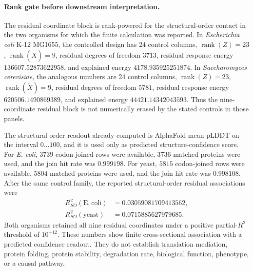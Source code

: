 \paragraph{Rank gate before downstream interpretation.}
The residual coordinate block is rank-powered for the structural-order contact in the two organisms for which the finite calculation was reported. In \emph{Escherichia coli} K-12 MG1655, the controlled design has $24$ control columns, $\operatorname{rank}(Z)=23$, $\operatorname{rank}(\widetilde X)=9$, residual degrees of freedom $3713$, residual response energy $136607.52873622958$, and explained energy $4178.935925251874$. In \emph{Saccharomyces cerevisiae}, the analogous numbers are $24$ control columns, $\operatorname{rank}(Z)=23$, $\operatorname{rank}(\widetilde X)=9$, residual degrees of freedom $5781$, residual response energy $620506.1490869389$, and explained energy $44421.14342043593$. Thus the nine-coordinate residual block is not numerically erased by the stated controls in those panels.

The structural-order readout already computed is AlphaFold mean pLDDT on the interval $0\ldots 100$, and it is used only as predicted structure-confidence score. For \emph{E. coli}, $3739$ codon-joined rows were available, $3736$ matched proteins were used, and the join hit rate was $0.999198$. For yeast, $5815$ codon-joined rows were available, $5804$ matched proteins were used, and the join hit rate was $0.998108$. After the same control family, the reported structural-order residual associations were
$$
\begin{aligned}
R^2_{SO}(\mathrm{E.\ coli}) &= 0.03059081709413562,\\
R^2_{SO}(\mathrm{yeast}) &= 0.0715885627979685.
\end{aligned}
$$
Both organisms retained all nine residual coordinates under a positive partial-$R^2$ threshold of $10^{-12}$. These numbers show finite cross-sectional association with a predicted confidence readout. They do not establish translation mediation, protein folding, protein stability, degradation rate, biological function, phenotype, or a causal pathway.

